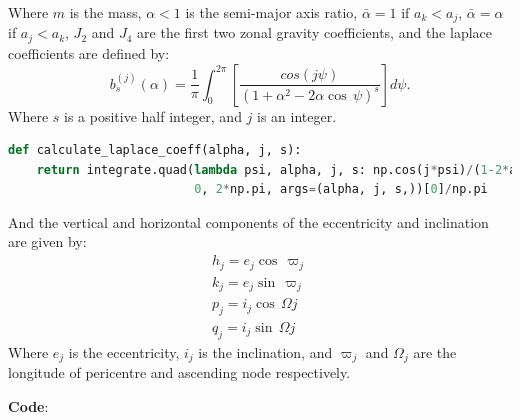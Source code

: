 \documentclass[11pt, oneside]{article}   	%
\begin{document}
Where $m$ is the mass, $\alpha < 1$ is the semi-major axis ratio, $\bar{\alpha} = 1 \text{ if } a_{k} < a_{j}$, $\bar{\alpha} = \alpha$ if $a_{j}<a_{k}$, $J_{2}$ and $J_{4}$ are the first two zonal gravity coefficients, and the laplace coefficients are defined by:
\begin{equation}
b^{(j)}_{s} (\alpha) = \frac{1}{\pi}\int_{0}^{2\pi}\left [ \frac{cos(j \psi)}{(1+\alpha^{2} - 2\alpha \cos\, \psi)^{s}} \right]d\psi.
\end{equation}
Where $s$ is a positive half integer, and $j$ is an integer. 
\begin{lstlisting}[language=Python, caption={Calculating the laplace coefficient}]
def calculate_laplace_coeff(alpha, j, s):
    return integrate.quad(lambda psi, alpha, j, s: np.cos(j*psi)/(1-2*alpha*np.cos(psi)+alpha**2)**s,
                          0, 2*np.pi, args=(alpha, j, s,))[0]/np.pi
\end{lstlisting}

And the vertical and horizontal components of the eccentricity and inclination are given by:
\begin{subequations}
\begin{gather}
\label{eq:h}
   h_{j} = e_{j}\cos\, \varpi_{j}\\
\label{eq:k}
   k_{j} = e_{j}\sin\, \varpi_{j}\\
\label{eq:p}
   p_{j} = i_{j}\cos\, \Omega{j}\\
\label{eq:q}
   q_{j} = i_{j}\sin\, \Omega{j}
\end{gather}
\end{subequations}
Where $e_{j}$ is the eccentricity, $i_{j}$ is the inclination, and $\varpi_{j}$ and $\Omega_{j}$ are the longitude of pericentre and ascending node respectively. 

\textbf{Code}:
\end{document}
